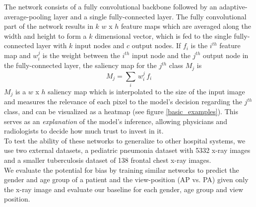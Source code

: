 \documentclass[12pt,oneside,a4paper]{report}
\begin{document}
The network consists of a fully convolutional backbone followed by an
adaptive-average-pooling layer and a single fully-connected layer. The fully
convolutional part of the network results in $k$ $w$ x $h$ feature maps which
are averaged along the width and height to form a $k$ dimensional vector, which
is fed to the single fully-connected layer with $k$ input nodes and $c$ output
nodes. If $f_i$ is the $i^{th}$ feature map and $w^j _i$ is the weight between
the $i^{th}$ input node and the $j^{th}$ output node in the fully-connected
layer, the saliency map for the $j^{th}$ class $M_j$ is
\begin{equation}
  M_j = \sum _i \, w^j _i \, f_i
\end{equation}
$M_j$ is a $w$ x $h$ saliency map which is interpolated to the size of the input
image and measures the relevance of each pixel to the model's decision regarding
the $j^{th}$ class, and can be visualized as a heatmap (see figure
\ref{basic_examples}). This serves as an \emph{explanation} of the model's
inference, allowing physicians and radiologists to decide how much trust to
invest in it.\\

To test the ability of these networks to generalize to other hospital systems,
we use two external datasets, a pediatric pneumonia dataset with 5332 x-ray
images\cite{kermany2018identifying} and a smaller tuberculosis dataset of 138
frontal chest x-ray images\cite{jaeger2014two}.\\

We evaluate the potential for bias by training similar networks to predict the
gender and age group of a patient and the view-position (AP vs. PA) given only
the x-ray image and evaluate our baseline for each gender, age group and view
position.\\
\end{document}
